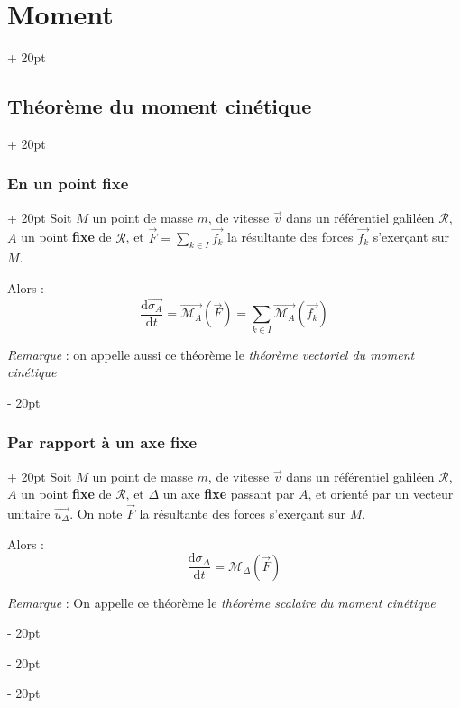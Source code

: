 \documentclass[a4paper, 12pt, twoside]{article}
\newcommand{\dt}[2][t]{\dfrac{\mathrm d #2}{\mathrm d #1}} %
\newcommand{\vect}{\overrightarrow}
\newcommand{\lr}[1]{\left( #1 \right)}
\newcommand{\ind}[1][20pt]{\advance\leftskip + #1}
\newcommand{\deind}[1][20pt]{\advance\leftskip - #1}
\newenvironment{indt}[2][20pt]{#2 \par \ind[#1]}{\par \deind} %
\begin{document}
\begin{indt}{\section{Moment}}
        \vspace{12pt}
        
        \begin{indt}{\subsection{Théorème du moment cinétique}}
            \begin{indt}{\subsubsection{En un point fixe}}
                Soit $M$ un point de masse $m$, de vitesse $\vec v$ dans un référentiel galiléen $\mathscr R$, $A$ un point \textbf{fixe} de $\mathscr R$, et $\displaystyle \vec F = \sum_{k \in I} \vec{f_k}$ la résultante des forces $\vec{f_k}$ s'exerçant sur $M$.

                \vspace{6pt}
                
                Alors :
                \[
                    \dt{\vect{\sigma_A}} = \vect{\mathscr M_A}\!\lr{\vec F}
                    = \sum_{k \in I} \vect{\mathscr M_A}\!\lr{\vec{f_k}}
                \]

                \textit{Remarque} : on appelle aussi ce théorème le \textit{théorème vectoriel du moment cinétique}
            \end{indt}

            \vspace{12pt}
            
            \begin{indt}{\subsubsection{Par rapport à un axe fixe}}
                Soit $M$ un point de masse $m$, de vitesse $\vec v$ dans un référentiel galiléen $\mathscr R$, $A$ un point \textbf{fixe} de $\mathscr R$, et $\Delta$ un axe \textbf{fixe} passant par $A$, et orienté par un vecteur unitaire $\vect{u_\Delta}$.
                On note $\vec F$ la résultante des forces s'exerçant sur $M$.

                \vspace{6pt}
                
                Alors :
                \[
                    \dt{\sigma_\Delta} = \mathscr M_\Delta\!\lr{\vec F}
                \]

                \textit{Remarque} : On appelle ce théorème le \textit{théorème scalaire du moment cinétique}
            \end{indt}
        \end{indt}
    \end{indt}
    
    
    
\end{document}

